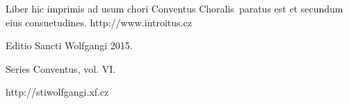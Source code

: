 \documentclass[a4paper, twoside, 12pt]{article}
\newcommand{\annusEditionis}{2015}
\begin{document}
\begin{center}
Liber hic imprimis ad usum chori
\guillemotright Conventus Choralis\guillemotleft\
paratus est
et secundum eius consuetudines.
http://www.introitus.cz

\vfill

{\large Editio Sancti Wolfgangi \annusEditionis.}

\vfill

Series \guillemotright Conventus\guillemotleft, vol. VI.

\vfill

http://stiwolfgangi.xf.cz

\end{center}

\vfill
\end{document}
